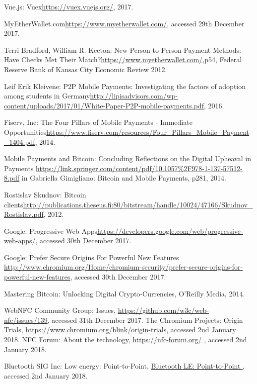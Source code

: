 \begin{thebibliography}{99}
 Vue.js: Vuex\url{https://vuex.vuejs.org/}, 2017.

 MyEtherWallet.com\url{https://www.myetherwallet.com/}, accessed 29th December 2017.

 Terri Bradford, William R. Keeton: New Person-to-Person
Payment Methods: Have Checks Met Their Match?\url{https://www.myetherwallet.com/},p54, Federal Reserve Bank of Kansas City Economic Review 2012.

 Leif Erik Kleivene: P2P Mobile Payments: Investigating the factors of adoption among students in Germany\url{http://lipisadvisors.com/wp-content/uploads/2017/01/White-Paper-P2P-mobile-payments.pdf}, 2016.

 Fiserv, Inc: The Four Pillars of Mobile Payments - Immediate Opportunities\url{https://www.fiserv.com/resources/Four_Pillars_Mobile_Payment_1404.pdf}, 2014.

Mobile Payments and Bitcoin: Concluding Reflections on the Digital Upheaval in Payments \url{https://link.springer.com/content/pdf/10.1057\%2F978-1-137-57512-8.pdf} in Gabriella Gimigliano: Bitcoin and Mobile Payments, p281, 2014.

Rostislav Skudnov: Bitcoin clients\url{http://publications.theseus.fi:80/bitstream/handle/10024/47166/Skudnov_Rostislav.pdf}, 2012.

Google: Progressive Web Apps\url{https://developers.google.com/web/progressive-web-apps/}, accessed 30th December 2017.

Google: Prefer Secure Origins For Powerful New Features \url{http://www.chromium.org/Home/chromium-security/prefer-secure-origins-for-powerful-new-features}, accessed 30th December 2017.

Mastering Bitcoin: Unlocking Digital Crypto-Currencies, O'Reilly Media, 2014.

WebNFC Community Group: Issues, \url{https://github.com/w3c/web-nfc/issues/139}, accessed 31th December 2017.
The Chromium Projects: Origin Trials, \url{https://www.chromium.org/blink/origin-trials}, accessed 2nd January 2018.
NFC Forum: About the technology, \url{https://nfc-forum.org/
}, accessed 2nd January 2018.

Bluetooth SIG Inc: Low energy: Point-to-Point, \url{Bluetooth LE: Point-to-Point
}, accessed 2nd January 2018.


\end{thebibliography}
